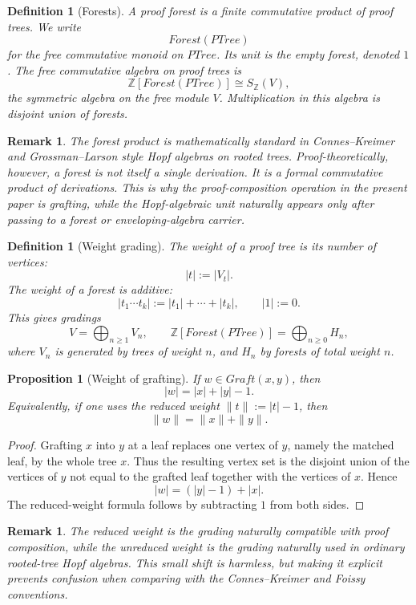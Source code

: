 \documentclass[11pt]{article}
\newtheorem{proposition}[theorem]{Proposition}
\newtheorem{definition}[theorem]{Definition}
\newtheorem{remark}[theorem]{Remark}
\newcommand{\PTree}{\mathit{PTree}}
\newcommand{\Forest}{\mathit{Forest}}
\newcommand{\Graft}{\mathit{Graft}}
\newcommand{\ZZ}{\mathbb{Z}}
\begin{document}
\begin{definition}[Forests]
A \emph{proof forest} is a finite commutative product of proof trees. We write
\[
\Forest(\PTree)
\]
for the free commutative monoid on \(\PTree\). Its unit is the empty forest,
denoted \(1\). The free commutative algebra on proof trees is
\[
\ZZ[\Forest(\PTree)]\cong S_{\ZZ}(V),
\]
the symmetric algebra on the free module \(V\). Multiplication in this algebra
is disjoint union of forests.
\end{definition}

\begin{remark}
The forest product is mathematically standard in Connes--Kreimer and
Grossman--Larson style Hopf algebras on rooted trees. Proof-theoretically,
however, a forest is not itself a single derivation. It is a formal commutative
product of derivations. This is why the proof-composition operation in the
present paper is grafting, while the Hopf-algebraic unit naturally appears
only after passing to a forest or enveloping-algebra carrier.
\end{remark}

\begin{definition}[Weight grading]
The \emph{weight} of a proof tree is its number of vertices:
\[
|t|:=|V_t|.
\]
The weight of a forest is additive:
\[
|t_1\cdots t_k|:=|t_1|+\cdots+|t_k|,
\qquad |1|:=0.
\]
This gives gradings
\[
V=\bigoplus_{n\ge 1}V_n,
\qquad
\ZZ[\Forest(\PTree)]=\bigoplus_{n\ge 0}H_n,
\]
where \(V_n\) is generated by trees of weight \(n\), and \(H_n\) by forests of
total weight \(n\).
\end{definition}

\begin{proposition}[Weight of grafting]
If \(w\in\Graft(x,y)\), then
\[
|w|=|x|+|y|-1.
\]
Equivalently, if one uses the reduced weight
\(\|t\|:=|t|-1\), then
\[
\|w\|=\|x\|+\|y\|.
\]
\end{proposition}

\begin{proof}
Grafting \(x\) into \(y\) at a leaf replaces one vertex of \(y\), namely the
matched leaf, by the whole tree \(x\). Thus the resulting vertex set is the
disjoint union of the vertices of \(y\) not equal to the grafted leaf together
with the vertices of \(x\). Hence
\[
|w|=(|y|-1)+|x|.
\]
The reduced-weight formula follows by subtracting \(1\) from both sides.
\end{proof}

\begin{remark}
The reduced weight is the grading naturally compatible with proof
composition, while the unreduced weight is the grading naturally used in
ordinary rooted-tree Hopf algebras. This small shift is harmless, but making it
explicit prevents confusion when comparing with the Connes--Kreimer and
Foissy conventions.
\end{remark}
\end{document}
